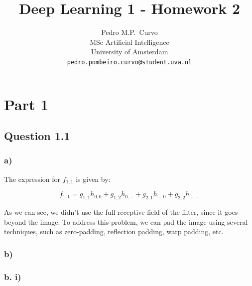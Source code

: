 \documentclass{article}
\title{Deep Learning 1 - Homework 2}
\author{%
  Pedro M.P.~Curvo \\
  MSc Artificial Intelligence\\
  University of Amsterdam\\
  \texttt{pedro.pombeiro.curvo@student.uva.nl} \\
}
\begin{document}
\maketitle




\section*{Part 1}

\subsection*{Question 1.1}

\subsubsection*{a)}

The expression for $f_{1, 1}$ is given by:

\begin{equation}
    f_{1, 1} = g_{1, 1} h_{0, 0} + g_{1, 2} h_{0, -} + g_{2, 1} h_{-, 0} + g_{2, 2} h_{-, -}
\end{equation}

As we can see, we didn't use the full receptive field of the filter, since it goes beyond the image.
To address this problem, we can pad the image using several techniques, such as zero-padding, reflection padding, warp padding, etc.

\subsubsection*{b)}

\subsubsection*{b. i)}
\end{document}
